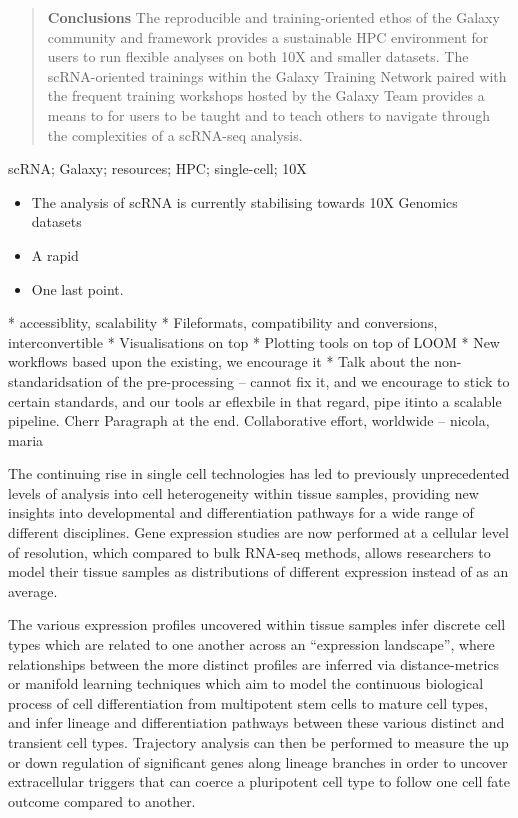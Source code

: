 \documentclass[a4paper,num-refs]{oup-contemporary}
\begin{document}
\begin{frontmatter}
\begin{abstract}
\textbf{Conclusions}
The reproducible and training-oriented ethos of the Galaxy community and framework provides a sustainable HPC environment for users to run flexible analyses on both 10X and smaller datasets. The scRNA-oriented trainings within the Galaxy Training Network paired with the frequent training workshops hosted by the Galaxy Team provides a means to for users to be taught and to teach others to navigate through the complexities of a scRNA-seq analysis.
\end{abstract}

\begin{keywords}
scRNA; Galaxy; resources; HPC; single-cell; 10X
\end{keywords}
\end{frontmatter}

\begin{keypoints*}
\begin{itemize}
\item The analysis of scRNA is currently stabilising towards 10X Genomics datasets
\item A rapid
\item One last point.
\end{itemize}
\end{keypoints*}

* accessiblity, scalability
* Fileformats, compatibility and conversions, interconvertible
* Visualisations on top
* Plotting tools on top of LOOM
* New workflows based upon the existing, we encourage it
* Talk about the non-standaridsation of the pre-processing -- cannot fix it, and we encourage to stick to certain standards, and our tools ar eflexbile in that regard, pipe itinto a scalable pipeline. Cherr
Paragraph at the end.
Collaborative effort, worldwide -- nicola, maria

The continuing rise in single cell technologies has led to previously unprecedented levels of analysis into cell heterogeneity within tissue samples, providing new insights into developmental and differentiation pathways for a wide range of different disciplines. Gene expression studies are now performed at a cellular level of resolution, which compared to bulk RNA-seq methods, allows researchers to model their tissue samples as distributions of different expression instead of as an average.

The various expression profiles uncovered within tissue samples infer discrete cell types which are related to one another across an ``expression landscape'', where relationships between the more distinct profiles are inferred via distance-metrics or manifold learning techniques which aim to model the continuous biological process of cell differentiation from multipotent stem cells to mature cell types, and infer lineage and differentiation pathways between these various distinct and transient cell types. Trajectory analysis can then be performed to measure the up or down regulation of significant genes along lineage branches in order to uncover extracellular triggers that can coerce a pluripotent cell type to follow one cell fate outcome compared to another.
\end{document}
